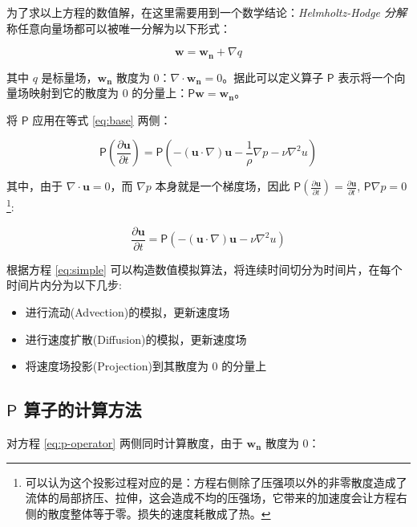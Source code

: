 \documentclass{ctexart}
\begin{document}
为了求以上方程的数值解，在这里需要用到一个数学结论：\textit{Helmholtz-Hodge 分解} 称任意向量场都可以被唯一分解为以下形式：

\begin{equation}
\label{eq:p-operator}
\mathbf{w} = \mathbf{w_n} + \nabla q
\end{equation}

其中 $q$ 是标量场，$\mathbf{w_n}$ 散度为 0：$\nabla \cdot \mathbf{w_n} = 0$。据此可以定义算子 $\mathsf{P}$ 表示将一个向量场映射到它的散度为 0 的分量上：$\mathsf{P} \mathbf{w} = \mathbf{w_n}$。

将 $\mathsf{P}$ 应用在等式 \ref{eq:base} 两侧：

\begin{equation}
\mathsf{P}(\frac{\partial \mathbf{u}}{\partial t})
= \mathsf{P}(- (\mathbf{u} \cdot \nabla) \mathbf{u} - \frac{1}{\rho} \nabla p - \nu \nabla^2 u)
\end{equation}

其中，由于 $\nabla \cdot \mathbf{u} = 0$，而 $\nabla p$ 本身就是一个梯度场，因此 $\mathsf{P}(\frac{\partial \mathbf{u}}{\partial t}) = \frac{\partial \mathbf{u}}{\partial t}$, $\mathsf{P} \nabla p = 0$ \footnote{
  可以认为这个投影过程对应的是：方程右侧除了压强项以外的非零散度造成了流体的局部挤压、拉伸，这会造成不均的压强场，它带来的加速度会让方程右侧的散度整体等于零。损失的速度耗散成了热。
}:

\begin{equation}
\label{eq:simple}
\frac{\partial \mathbf{u}}{\partial t}
= \mathsf{P}(- (\mathbf{u} \cdot \nabla) \mathbf{u} - \nu \nabla^2 u)
\end{equation}

根据方程 \ref{eq:simple} 可以构造数值模拟算法，将连续时间切分为时间片，在每个时间片内分为以下几步:

\begin{itemize}
\item 进行流动(Advection)的模拟，更新速度场
\item 进行速度扩散(Diffusion)的模拟，更新速度场
\item 将速度场投影(Projection)到其散度为 0 的分量上
\end{itemize}

\subsection{$\mathsf{P}$ 算子的计算方法}
\label{sec:p-operator}
对方程 \ref{eq:p-operator} 两侧同时计算散度，由于 $\mathbf{w_n}$ 散度为 0：
\end{document}
